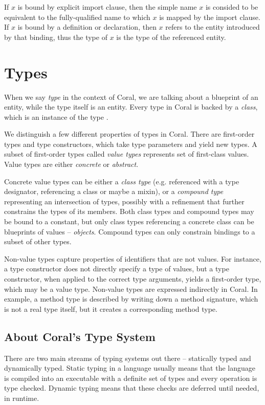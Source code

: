 If $x$ is bound by explicit \lstinline@use@ import clause, then the simple name $x$ is consided to be equivalent to the fully-qualified name to which $x$ is mapped by the import clause. If $x$ is bound by a definition or declaration, then $x$ refers to the entity introduced by that binding, thus the type of $x$ is the type of the referenced entity. 

\chapter{Types}

When we say \textit{type} in the context of Coral, we are talking about a blueprint of an entity, while the type itself is an entity. Every type in Coral is backed by a \textit{class}, which is an instance of the type \lstinline@Class@. 

We distinguish a few different properties of types in Coral. There are first-order types and type constructors, which take type parameters and yield new types. A subset of first-order types called \textit{value types} represents set of first-class values. Value types are either \textit{concrete} or \textit{abstract}. 

Concrete value types can be either a \textit{class type} (e.g. referenced with a type designator, referencing a class or maybe a mixin), or a \textit{compound type} representing an intersection of types, possibly with a refinement that further constrains the types of its members. Both class types and compound types may be bound to a constant, but only class types referencing a concrete class can be blueprints of values -- \textit{objects}. Compound types can only constrain bindings to a subset of other types. 

Non-value types capture properties of identifiers that are not values. For instance, a type constructor does not directly specify a type of values, but a type constructor, when applied to the correct type arguments, yields a first-order type, which may be a value type. Non-value types are expressed indirectly in Coral. In example, a method type is described by writing down a method signature, which is not a real type itself, but it creates a corresponding method type. 

\section{About Coral's Type System}

There are two main streams of typing systems out there -- statically typed and dynamically typed. Static typing in a language usually means that the language is compiled into an executable with a definite set of types and every operation is type checked. Dynamic typing means that these checks are deferred until needed, in runtime. 

